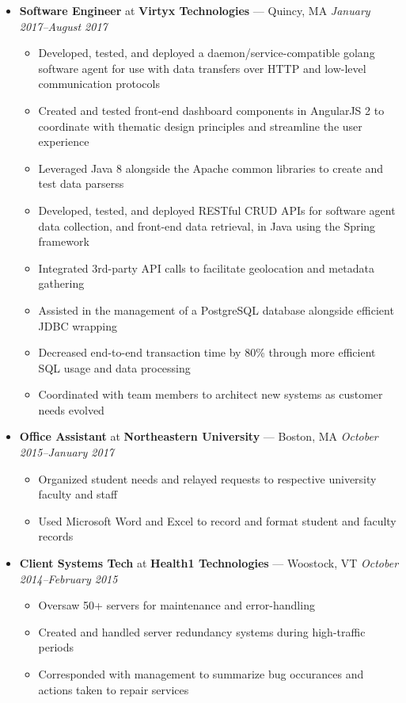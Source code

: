 \documentclass{article}
\begin{document}
\begin{itemize}[label={},leftmargin=*]
\item \textbf{Software Engineer} at \textbf{Virtyx Technologies} --- Quincy, MA \hfill {\em January 2017--August 2017}
  \begin{itemize}[label={$\bullet$}]
  \item Developed, tested, and deployed a daemon/service-compatible golang software agent for use with data transfers over HTTP and low-level communication protocols
  \item Created and tested front-end dashboard components in AngularJS 2 to coordinate with thematic design principles and streamline the user experience
  \item Leveraged Java 8 alongside the Apache common libraries to create and test data parserss
  \item Developed, tested, and deployed RESTful CRUD APIs for software agent data collection, and front-end data retrieval, in Java using the Spring framework
  \item Integrated 3rd-party API calls to facilitate geolocation and metadata gathering
  \item Assisted in the management of a PostgreSQL database alongside efficient JDBC wrapping
  \item Decreased end-to-end transaction time by 80\% through more efficient SQL usage and data processing
  \item Coordinated with team members to architect new systems as customer needs evolved
  \end{itemize}

\item \textbf{Office Assistant} at \textbf{Northeastern University} --- Boston, MA \hfill {\em October 2015--January 2017}
  \begin{itemize}[label={$\bullet$}]
  \item Organized student needs and relayed requests to respective university faculty and staff
  \item Used Microsoft Word and Excel to record and format student and faculty records
  \end{itemize}

\item \textbf{Client Systems Tech} at \textbf{Health1 Technologies} --- Woostock, VT \hfill {\em October 2014--February 2015}
  \begin{itemize}[label={$\bullet$}]
  \item Oversaw 50+ servers for maintenance and error-handling
  \item Created and handled server redundancy systems during high-traffic periods
  \item Corresponded with management to summarize bug occurances and actions taken to repair services
  \end{itemize}
\end{itemize}
\end{document}
